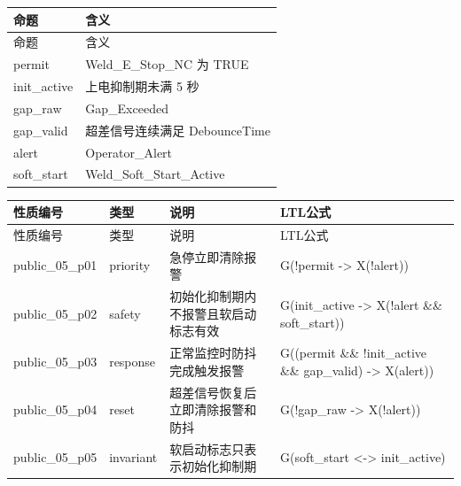 \begin{longtable}{L{3.3cm}L{10.0cm}}

\toprule

命题 & 含义\\

\midrule

\endfirsthead

\toprule

命题 & 含义\\

\midrule

\endhead

{\ttfamily permit} & Weld\_E\_Stop\_NC 为 TRUE\\

{\ttfamily init\_active} & 上电抑制期未满 5 秒\\

{\ttfamily gap\_raw} & Gap\_Exceeded\\

{\ttfamily gap\_valid} & 超差信号连续满足 DebounceTime\\

{\ttfamily alert} & Operator\_Alert\\

{\ttfamily soft\_start} & Weld\_Soft\_Start\_Active\\

\bottomrule

\end{longtable}

\begin{longtable}{L{2.3cm}L{1.7cm}L{4.1cm}L{5.2cm}}

\toprule

性质编号 & 类型 & 说明 & LTL公式\\

\midrule

\endfirsthead

\toprule

性质编号 & 类型 & 说明 & LTL公式\\

\midrule

\endhead

{\ttfamily public\_05\_p01} & priority & 急停立即清除报警 & {\ttfamily G(!permit -> X(!alert))}\\

{\ttfamily public\_05\_p02} & safety & 初始化抑制期内不报警且软启动标志有效 & {\ttfamily G(init\_active -> X(!alert \&\& soft\_start))}\\

{\ttfamily public\_05\_p03} & response & 正常监控时防抖完成触发报警 & {\ttfamily G((permit \&\& !init\_active \&\& gap\_valid) -> X(alert))}\\

{\ttfamily public\_05\_p04} & reset & 超差信号恢复后立即清除报警和防抖 & {\ttfamily G(!gap\_raw -> X(!alert))}\\

{\ttfamily public\_05\_p05} & invariant & 软启动标志只表示初始化抑制期 & {\ttfamily G(soft\_start <-> init\_active)}\\

\bottomrule

\end{longtable}

